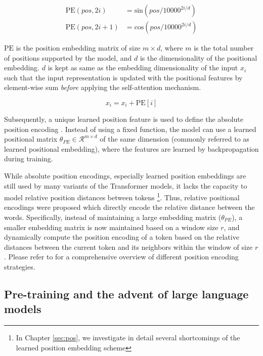\documentclass[letterpaper, 12pt]{report}
\begin{document}
\begin{equation}
  \begin{aligned}
	\text{PE}(pos, 2i) &= \text{sin}(pos / 10000^{2i / d}) \\
    \text{PE}(pos, 2i+1) &= \text{cos}(pos / 10000^{2i / d})
  \end{aligned}
\end{equation}

\noindent $\text{PE}$ is the position embedding matrix of size $m \times d$, where $m$ is the total number of positions supported by the model, and $d$ is the dimensionality of the positional embedding. $d$ is kept as same as the embedding dimensionality of the input $x_{i}$ such that the input representation is updated with the positional features by element-wise sum \textit{before} applying the self-attention mechanism.

\begin{equation}
  x_{i} = x_{i} + \text{PE}[i]
\end{equation}

Subsequently, a unique learned position feature is used to define the absolute position encoding \citep{devlin-etal-2019-bert}. Instead of using a fixed function, the model can use a learned positional matrix $\theta_{PE} \in \mathcal{R}^{m \times d}$ of the same dimension (commonly referred to as learned positional embedding), where the features are learned by backpropagation during training.

While absolute position encodings, especially learned position embeddings are still used by many variants of the Transformer models, it lacks the capacity to model relative position distances between tokens \footnote{In Chapter \ref{sec:pos}, we investigate in detail several shortcomings of the learned position embedding scheme}. Thus, relative positional encodings were proposed \citep{shaw-etal-2018-self} which directly encode the relative distance between the words. Specifically, instead of maintaining a large embedding matrix ($\theta_{PE}$), a smaller embedding matrix is now maintained based on a window size $r$, and dynamically compute the position encoding of a token based on the relative distances between the current token and its neighbors within the window of size $r$.
Please refer to \citet{wang2021on,dufter2021position} for a comprehensive overview of different position encoding strategies.

\subsection{Pre-training and the advent of large language models}
\label{sec:bg_pretraining}
\end{document}
